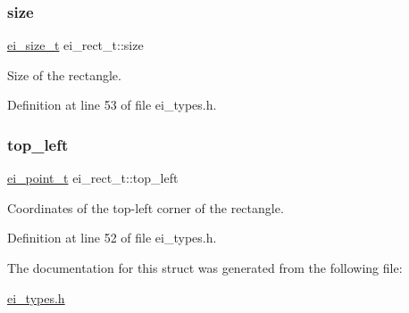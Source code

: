 \subsubsection{\texorpdfstring{size}{size}}
{\footnotesize\ttfamily \hyperlink{structei__size__t}{ei\+\_\+size\+\_\+t} ei\+\_\+rect\+\_\+t\+::size}



Size of the rectangle. 



Definition at line 53 of file ei\+\_\+types.\+h.

\mbox{\label{structei__rect__t_aabe78780aa971b9cb9742ed59a2e9438}} 
\subsubsection{\texorpdfstring{top\+\_\+left}{top\_left}}
{\footnotesize\ttfamily \hyperlink{structei__point__t}{ei\+\_\+point\+\_\+t} ei\+\_\+rect\+\_\+t\+::top\+\_\+left}



Coordinates of the top-\/left corner of the rectangle. 



Definition at line 52 of file ei\+\_\+types.\+h.



The documentation for this struct was generated from the following file\+:\begin{DoxyCompactItemize}
\item 
\hyperlink{ei__types_8h}{ei\+\_\+types.\+h}\end{DoxyCompactItemize}
